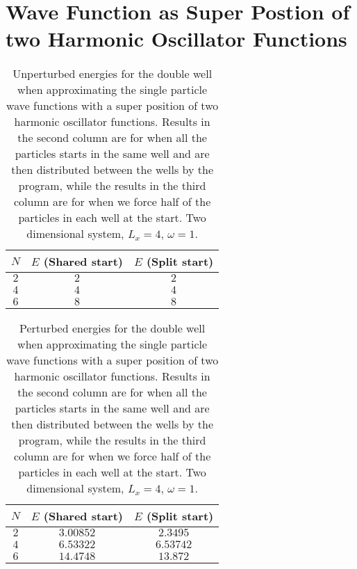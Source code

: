 \documentclass[../main.tex]{subfiles}
\begin{document}
\section{Wave Function as Super Postion of two Harmonic Oscillator Functions}
\begin{table}[!ht]
  \centering
  \begin{tabular}{ | c | c | c | }
    \hline
    $N$ & $E$ (\textrm{Shared start}) & $E$ (\textrm{Split start}) \\*
    \hline
    $2$ & $2$ & $2$ \\*
    \hline
    $4$ & $4$ & $4$ \\*
    \hline
    $6$ & $8$ & $8$ \\*
    \hline
  \end{tabular}
  \caption{Unperturbed energies for the double well when approximating the single particle wave functions with a super position of two harmonic oscillator functions. Results in the second column are for when all the particles starts in the same well and are then distributed between the wells by the program, while the results in the third column are for when we force half of the particles in each well at the start. Two dimensional system, $L_x=4$, $\omega=1$.}
  \label{tab: unperturbedEnergiesSupPos}
\end{table}

\begin{table}[!ht]
  \centering
  \begin{tabular}{ | c | c | c | }
    \hline
    $N$ & $E$ (\textrm{Shared start}) & $E$ (\textrm{Split start}) \\*
    \hline
    $2$ & $3.00852$ & $2.3495$ \\*
    \hline
    $4$ & $6.53322$ & $6.53742$ \\*
    \hline
    $6$ & $14.4748$ & $13.872$ \\*
    \hline
  \end{tabular}
  \caption{Perturbed energies for the double well when approximating the single particle wave functions with a super position of two harmonic oscillator functions. Results in the second column are for when all the particles starts in the same well and are then distributed between the wells by the program, while the results in the third column are for when we force half of the particles in each well at the start. Two dimensional system, $L_x=4$, $\omega=1$.}
  \label{tab: perturbedEnergiesSupPos}
\end{table}
\end{document}
